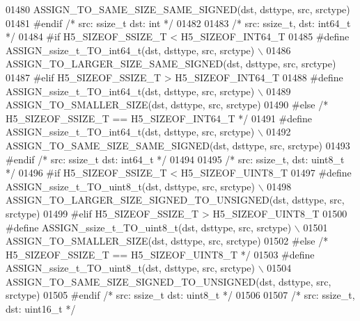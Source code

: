 \begin{DoxyCode}
01480 \textcolor{preprocessor}{        ASSIGN\_TO\_SAME\_SIZE\_SAME\_SIGNED(dst, dsttype, src, srctype)}
01481 \textcolor{preprocessor}{#endif }\textcolor{comment}{/* src: ssize\_t dst: int */}\textcolor{preprocessor}{}
01482 
01483 \textcolor{comment}{/* src: ssize\_t, dst: int64\_t */}
01484 \textcolor{preprocessor}{#if H5\_SIZEOF\_SSIZE\_T < H5\_SIZEOF\_INT64\_T}
01485 \textcolor{preprocessor}{    #define ASSIGN\_ssize\_t\_TO\_int64\_t(dst, dsttype, src, srctype) \(\backslash\)}
01486 \textcolor{preprocessor}{        ASSIGN\_TO\_LARGER\_SIZE\_SAME\_SIGNED(dst, dsttype, src, srctype)}
01487 \textcolor{preprocessor}{#elif H5\_SIZEOF\_SSIZE\_T > H5\_SIZEOF\_INT64\_T}
01488 \textcolor{preprocessor}{    #define ASSIGN\_ssize\_t\_TO\_int64\_t(dst, dsttype, src, srctype) \(\backslash\)}
01489 \textcolor{preprocessor}{        ASSIGN\_TO\_SMALLER\_SIZE(dst, dsttype, src, srctype)}
01490 \textcolor{preprocessor}{#else }\textcolor{comment}{/* H5\_SIZEOF\_SSIZE\_T == H5\_SIZEOF\_INT64\_T */}\textcolor{preprocessor}{}
01491 \textcolor{preprocessor}{    #define ASSIGN\_ssize\_t\_TO\_int64\_t(dst, dsttype, src, srctype) \(\backslash\)}
01492 \textcolor{preprocessor}{        ASSIGN\_TO\_SAME\_SIZE\_SAME\_SIGNED(dst, dsttype, src, srctype)}
01493 \textcolor{preprocessor}{#endif }\textcolor{comment}{/* src: ssize\_t dst: int64\_t */}\textcolor{preprocessor}{}
01494 
01495 \textcolor{comment}{/* src: ssize\_t, dst: uint8\_t */}
01496 \textcolor{preprocessor}{#if H5\_SIZEOF\_SSIZE\_T < H5\_SIZEOF\_UINT8\_T}
01497 \textcolor{preprocessor}{    #define ASSIGN\_ssize\_t\_TO\_uint8\_t(dst, dsttype, src, srctype) \(\backslash\)}
01498 \textcolor{preprocessor}{        ASSIGN\_TO\_LARGER\_SIZE\_SIGNED\_TO\_UNSIGNED(dst, dsttype, src, srctype)}
01499 \textcolor{preprocessor}{#elif H5\_SIZEOF\_SSIZE\_T > H5\_SIZEOF\_UINT8\_T}
01500 \textcolor{preprocessor}{    #define ASSIGN\_ssize\_t\_TO\_uint8\_t(dst, dsttype, src, srctype) \(\backslash\)}
01501 \textcolor{preprocessor}{        ASSIGN\_TO\_SMALLER\_SIZE(dst, dsttype, src, srctype)}
01502 \textcolor{preprocessor}{#else }\textcolor{comment}{/* H5\_SIZEOF\_SSIZE\_T == H5\_SIZEOF\_UINT8\_T */}\textcolor{preprocessor}{}
01503 \textcolor{preprocessor}{    #define ASSIGN\_ssize\_t\_TO\_uint8\_t(dst, dsttype, src, srctype) \(\backslash\)}
01504 \textcolor{preprocessor}{        ASSIGN\_TO\_SAME\_SIZE\_SIGNED\_TO\_UNSIGNED(dst, dsttype, src, srctype)}
01505 \textcolor{preprocessor}{#endif }\textcolor{comment}{/* src: ssize\_t dst: uint8\_t */}\textcolor{preprocessor}{}
01506 
01507 \textcolor{comment}{/* src: ssize\_t, dst: uint16\_t */}

\end{DoxyCode}
